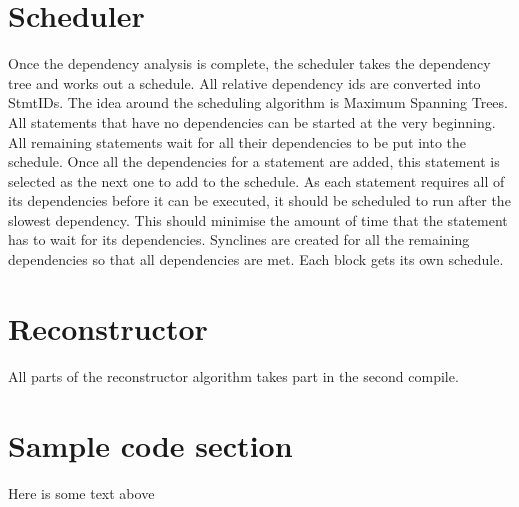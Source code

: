 \section{Scheduler}


Once the dependency analysis is complete, the scheduler takes the dependency tree and works out a schedule. All relative dependency ids are converted into StmtIDs. The idea around the scheduling algorithm is Maximum Spanning Trees. All statements that have no dependencies can be started at the very beginning. All remaining statements wait for all their dependencies to be put into the schedule. Once all the dependencies for a statement are added, this statement is selected as the next one to add to the schedule. As each statement requires all of its dependencies before it can be executed, it should be scheduled to run after the slowest dependency. This should minimise the amount of time that the statement has to wait for its dependencies. Synclines are created for all the remaining dependencies so that all dependencies are met. Each block gets its own schedule.

\section{Reconstructor}
All parts of the reconstructor algorithm takes part in the second compile.


\section{Sample code section}

Here is some text above


